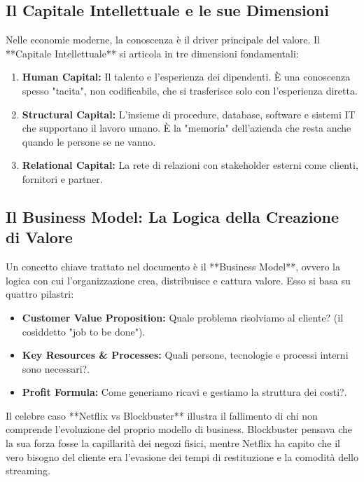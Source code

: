 \documentclass[a4paper,10pt]{article}
\begin{document}
\subsection*{Il Capitale Intellettuale e le sue Dimensioni}

Nelle economie moderne, la conoscenza è il driver principale del valore. Il **Capitale Intellettuale** si articola in tre dimensioni fondamentali:
\begin{enumerate}
    \item \textbf{Human Capital:} Il talento e l'esperienza dei dipendenti. È una conoscenza spesso "tacita", non codificabile, che si trasferisce solo con l'esperienza diretta.
    \item \textbf{Structural Capital:} L'insieme di procedure, database, software e sistemi IT che supportano il lavoro umano. È la "memoria" dell'azienda che resta anche quando le persone se ne vanno.
    \item \textbf{Relational Capital:} La rete di relazioni con stakeholder esterni come clienti, fornitori e partner.
\end{enumerate}

\subsection*{Il Business Model: La Logica della Creazione di Valore}

Un concetto chiave trattato nel documento è il **Business Model**, ovvero la logica con cui l'organizzazione crea, distribuisce e cattura valore. Esso si basa su quattro pilastri:
\begin{itemize}
    \item \textbf{Customer Value Proposition:} Quale problema risolviamo al cliente? (il cosiddetto "job to be done").
    \item \textbf{Key Resources \& Processes:} Quali persone, tecnologie e processi interni sono necessari?.
    \item \textbf{Profit Formula:} Come generiamo ricavi e gestiamo la struttura dei costi?.
\end{itemize}

Il celebre caso **Netflix vs Blockbuster** illustra il fallimento di chi non comprende l'evoluzione del proprio modello di business. Blockbuster pensava che la sua forza fosse la capillarità dei negozi fisici, mentre Netflix ha capito che il vero bisogno del cliente era l'evasione dei tempi di restituzione e la comodità dello streaming.
\end{document}
